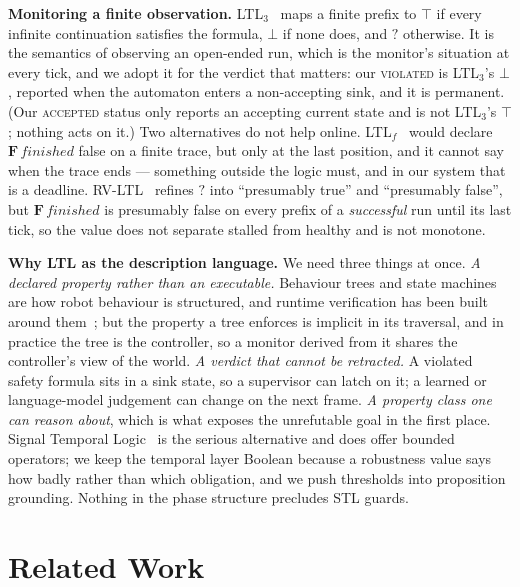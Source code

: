 \documentclass[letterpaper, 10pt, journal, twoside]{IEEEtran}
\newcommand{\F}{\mathbf{F}}
\begin{document}
\textbf{Monitoring a finite observation.} LTL$_3$~\cite{bauer2011runtime}
maps a finite prefix to $\top$ if every infinite continuation satisfies
the formula, $\bot$ if none does, and $?$ otherwise. It is the semantics
of observing an open-ended run, which is the monitor's situation at
every tick, and we adopt it for the verdict that matters: our
\textsc{violated} is LTL$_3$'s $\bot$, reported when the automaton
enters a non-accepting sink, and it is permanent. (Our
\textsc{accepted} status only reports an accepting current state and is
not LTL$_3$'s $\top$; nothing acts on it.) Two alternatives do not help
online. LTL$_f$~\cite{degiacomo2013linear} would declare
$\F\,\mathit{finished}$ false on a finite trace, but only at the last
position, and it cannot say when the trace ends --- something outside
the logic must, and in our system that is a deadline.
RV-LTL~\cite{bauer2010comparing} refines $?$ into ``presumably true''
and ``presumably false'', but $\F\,\mathit{finished}$ is presumably
false on every prefix of a \emph{successful} run until its last tick, so
the value does not separate stalled from healthy and is not monotone.

\textbf{Why LTL as the description language.} We need three things at
once. \emph{A declared property rather than an executable.} Behaviour
trees and state machines are how robot behaviour is structured, and
runtime verification has been built around
them~\cite{colledanchise2018behavior,colledanchise2021formalizing,ahmad2025unified};
but the property a tree enforces is implicit in its traversal, and in
practice the tree is the controller, so a monitor derived from it shares
the controller's view of the world. \emph{A verdict that cannot be
retracted.} A violated safety formula sits in a sink state, so a
supervisor can latch on it; a learned or language-model judgement can
change on the next frame. \emph{A property class one can reason about},
which is what exposes the unrefutable goal in the first place. Signal
Temporal Logic~\cite{maler2004monitoring,fainekos2009robustness} is the
serious alternative and does offer bounded operators; we keep the
temporal layer Boolean because a robustness value says how badly rather
than which obligation, and we push thresholds into proposition
grounding. Nothing in the phase structure precludes STL guards.

\section{Related Work}
\label{sec:related}
\end{document}
